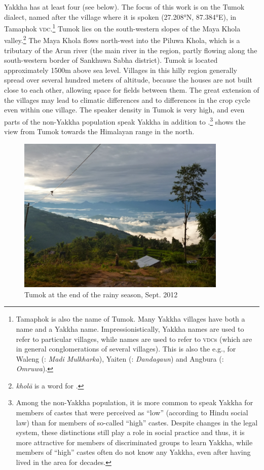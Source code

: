 Yakkha has at least four  (see  below). The focus of this work is on the Tumok dialect, named after the village where it is spoken (27.208°N, 87.384°E), in Tamaphok \textsc{vdc}.\footnote{Tamaphok is also the  name of Tumok. Many Yakkha villages have both a  name and a Yakkha name. Impressionistically, Yakkha names are used to refer to particular villages, while   names are used to refer  to \textsc{vdc}s (which are in general conglomerations of several villages). This is also the  e.g., for Waleng (: \emph{Madi Mulkharka}), Yaiten (: \emph{Dandagaun}) and Angbura (: \emph{Omruwa}).} Tumok  lies on the south-western slopes of the Maya Khola valley.\footnote{\emph{kholā} is a  word for .} The Maya Khola flows north-west into the Piluwa Khola, which is a tributary of the Arun river (the main river in the region, partly flowing along the south-western border of Sankhuwa Sabha district). Tumok  is located approximately 1500m above sea level. Villages in this hilly region generally spread over several hundred meters of altitude, because the houses are not built close to each other, allowing space for fields between them. The great extension of the villages may lead to climatic differences and to differences in the crop cycle even within one village. The speaker density in Tumok is very high, and even parts of the non-Yakkha population speak Yakkha in addition to .\footnote{Among the non-Yakkha population, it is more common to speak Yakkha for members of castes that were perceived as “low” (according to Hindu social law)  than for members of so-called “high” castes. Despite changes in the legal system, these distinctions still play a role in social practice and thus, it is more attractive for members of discriminated groups to learn Yakkha, while members of “high” castes often do not know any Yakkha, even after having lived in the area for decades.}  shows the view from Tumok towards the Himalayan range in the north. 

\begin{figure}
\centering
\includegraphics[width=10cm]{figures/tamaphok.jpg}
\caption{Tumok at the end of the rainy season, Sept. 2012}\label{tumok}
\end{figure}
 

